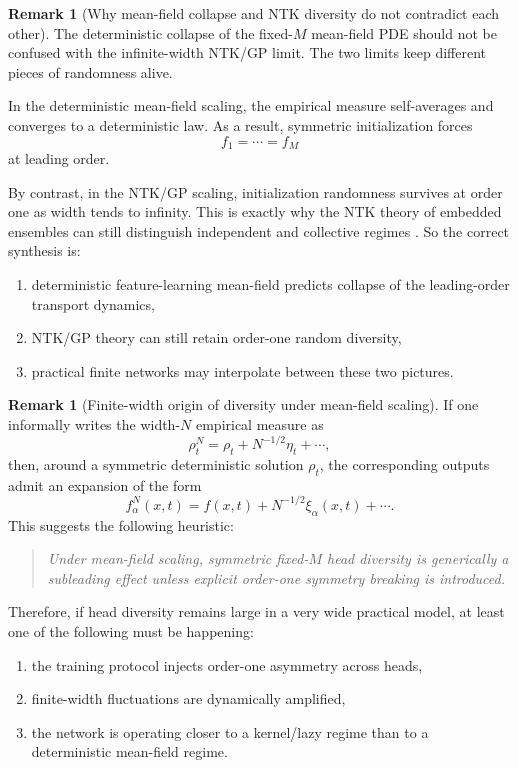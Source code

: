 \documentclass[11pt]{article}
\theoremstyle{definition}
\newtheorem{remark}[theorem]{Remark}
\begin{document}
\begin{remark}[Why mean-field collapse and NTK diversity do not contradict each other]
\label{rem:mf-vs-ntk}
The deterministic collapse of the fixed-$M$ mean-field PDE should not be confused with the infinite-width NTK/GP limit.
The two limits keep different pieces of randomness alive.

In the deterministic mean-field scaling, the empirical measure self-averages and converges to a deterministic law.
As a result, symmetric initialization forces
\[
  f_1=\cdots=f_M
\]
at leading order.

By contrast, in the NTK/GP scaling, initialization randomness survives at order one as width tends to infinity.
This is exactly why the NTK theory of embedded ensembles can still distinguish independent and collective regimes
\cite{embedded-ensembles}.
So the correct synthesis is:
\begin{enumerate}[leftmargin=2em]
  \item deterministic feature-learning mean-field predicts collapse of the leading-order transport dynamics,
  \item NTK/GP theory can still retain order-one random diversity,
  \item practical finite networks may interpolate between these two pictures.
\end{enumerate}
\end{remark}

\begin{remark}[Finite-width origin of diversity under mean-field scaling]
\label{rem:finite-width}
If one informally writes the width-$N$ empirical measure as
\[
  \rho_t^N = \rho_t + N^{-1/2}\eta_t + \cdots,
\]
then, around a symmetric deterministic solution $\rho_t$, the corresponding outputs admit an expansion of the form
\[
  f_\alpha^N(x,t)=f(x,t)+N^{-1/2}\xi_\alpha(x,t)+\cdots.
\]
This suggests the following heuristic:
\begin{quote}
\emph{Under mean-field scaling, symmetric fixed-$M$ head diversity is generically a subleading effect unless explicit order-one symmetry breaking is introduced.}
\end{quote}
Therefore, if head diversity remains large in a very wide practical model, at least one of the following must be happening:
\begin{enumerate}[leftmargin=2em]
  \item the training protocol injects order-one asymmetry across heads,
  \item finite-width fluctuations are dynamically amplified,
  \item the network is operating closer to a kernel/lazy regime than to a deterministic mean-field regime.
\end{enumerate}
\end{remark}
\end{document}
